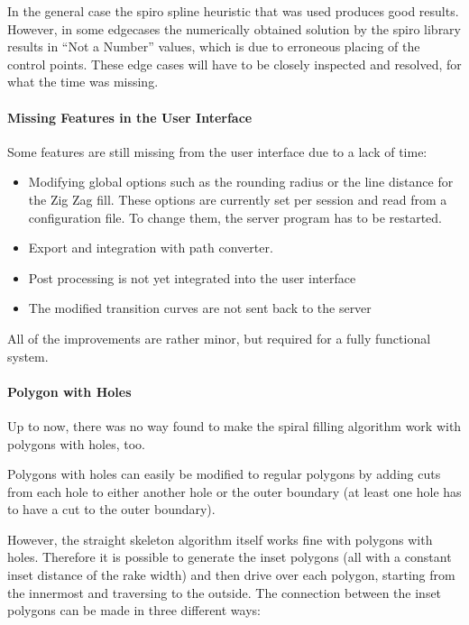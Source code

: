 In the general case the spiro spline heuristic that was used produces good results. However, in some edgecases the numerically obtained solution by the spiro library results in \enquote{Not a Number} values, which is due to erroneous placing of the control points. These edge cases will have to be closely inspected and resolved, for what the time was missing.

\paragraph{Missing Features in the User Interface} Some features are still missing from the user interface due to a lack of time: 

\begin{itemize}
\item Modifying global options such as the rounding radius or the line distance for the Zig Zag fill. These options are currently set per session and read from a configuration file. To change them, the server program has to be restarted.
\item Export and integration with path converter.
\item Post processing is not yet integrated into the user interface
\item The modified transition curves are not sent back to the server
\end{itemize}

All of the improvements are rather minor, but required for a fully functional system.

\paragraph{Polygon with Holes}

Up to now, there was no way found to make the spiral filling algorithm work with polygons with holes, too. 

Polygons with holes can easily be modified to regular polygons by adding cuts from each hole to either another hole or the outer boundary (at least one hole has to have a cut to the outer boundary).

However, the straight skeleton algorithm itself works fine with polygons with holes. Therefore it is possible to generate the inset polygons (all with a constant inset distance of the rake width) and then drive over each polygon, starting from the innermost and traversing to the outside.
The connection between the inset polygons can be made in three different ways:

